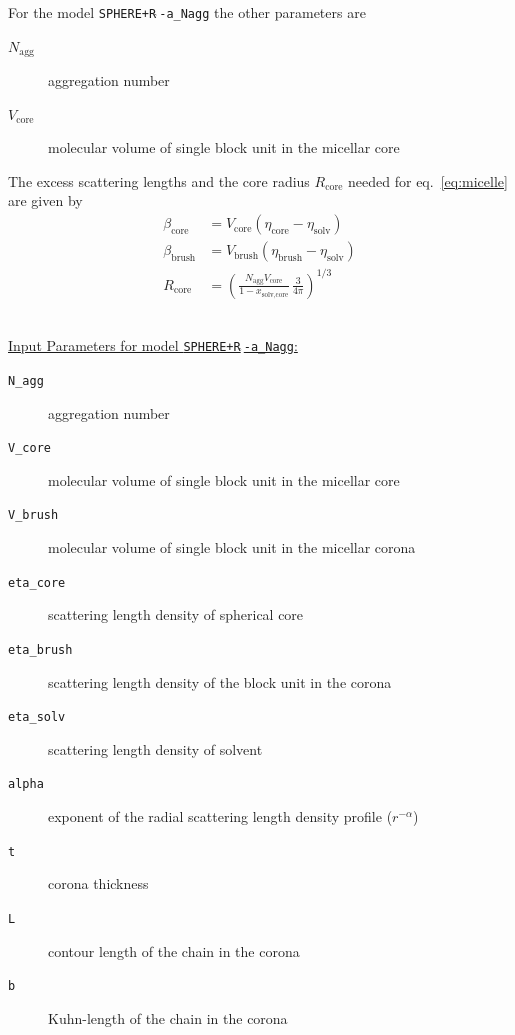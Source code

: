 \noindent
For the model \texttt{SPHERE+R$\hat{~}$-a\_Nagg} the other parameters are
\begin{description}
\item[$N_\text{agg}$] aggregation number
\item[$V_\text{core}$] molecular volume of single block unit in the micellar core
\end{description}
The excess scattering lengths and the core radius $R_\text{core}$ needed for eq.\
\ref{eq:micelle} are given by
\begin{align}
\beta_\text{core}  &= V_\text{core}  (\eta_\text{core} -\eta_\text{solv}) \\
\beta_\text{brush} &= V_\text{brush} (\eta_\text{brush}-\eta_\text{solv}) \\
R_\text{core} &= \left( \frac{N_\text{agg} V_\text{core}}{1-x_\text{solv,core}}
                         \, \frac{3}{4\pi}\right)^{1/3}
\end{align}

\hspace{1pt}\\
\uline{Input Parameters for model \texttt{SPHERE+R$\hat{~}$-a\_Nagg}:}
\begin{description}
\item[\texttt{N\_agg}] aggregation number
\item[\texttt{V\_core}] molecular volume of single block unit in the micellar core
\item[\texttt{V\_brush}]  molecular volume of single block unit in the micellar corona
\item[\texttt{eta\_core}] scattering length density of spherical core
\item[\texttt{eta\_brush}] scattering length density of the block unit in the corona
\item[\texttt{eta\_solv}] scattering length density of solvent
\item[\texttt{alpha}] exponent of the radial scattering length density profile ($r^{-\alpha}$)
\item[\texttt{t}] corona thickness
\item[\texttt{L}] contour length of the chain in the corona
\item[\texttt{b}] Kuhn-length of the chain in the corona
\end{description}





\vspace{5mm}

